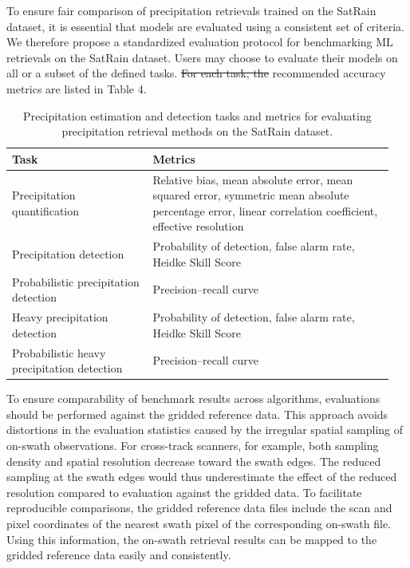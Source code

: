 \documentclass[11pt]{article}
\providecommand{\DIFadd}[1]{{\protect\color{blue}\uwave{#1}}} %
\providecommand{\DIFdel}[1]{{\protect\color{red}\sout{#1}}}                      %
\providecommand{\DIFaddbegin}{} %
\providecommand{\DIFaddend}{} %
\providecommand{\DIFdelbegin}{} %
\providecommand{\DIFdelend}{} %
\begin{document}
To ensure fair comparison of precipitation retrievals trained on the SatRain
dataset, it is essential that models are evaluated using a consistent set of
criteria. We therefore propose a standardized evaluation protocol for
benchmarking ML retrievals on the SatRain dataset. Users may choose to evaluate
their models on all or a subset of the defined tasks. \DIFdelbegin \DIFdel{For
each task, the }\DIFdelend \DIFaddbegin \DIFadd{The }\DIFaddend recommended accuracy
metrics \DIFaddbegin \DIFadd{for each task }\DIFaddend are listed in Table 4.

\begin{table}[htbp]
	\centering
	\caption{Precipitation estimation and detection tasks and metrics for evaluating
		precipitation retrieval methods on the SatRain dataset.}
	\begin{tabular}{>{\raggedright\arraybackslash}p{0.35\linewidth}
		>{\raggedright\arraybackslash}p{0.6\linewidth}} \toprule
		\textbf{Task}                               & \textbf{Metrics}                                   \\ \midrule Precipitation quantification &
		Relative bias, mean absolute error, mean squared error, symmetric mean
		absolute percentage error, linear correlation coefficient, effective
		resolution                                                                                       \\
		\addlinespace
		Precipitation detection                     & Probability of detection, false alarm rate, Heidke
		Skill Score                                                                                      \\
		\addlinespace
		Probabilistic precipitation detection       & Precision--recall curve                            \\
		\addlinespace
		Heavy precipitation detection               & Probability of detection, false alarm rate,
		Heidke Skill Score                                                                               \\
		\addlinespace
		Probabilistic heavy precipitation detection & Precision--recall curve
		\\ \bottomrule
	\end{tabular}
\end{table}

To ensure comparability of benchmark results across algorithms, evaluations
should be performed against the gridded reference data. This approach avoids
distortions in the evaluation statistics caused by the irregular spatial
sampling of on-swath observations. For cross-track scanners, for example, both
sampling density and spatial resolution decrease toward the swath edges. The
reduced sampling at the swath edges would thus underestimate the effect of the
reduced resolution compared to evaluation against the gridded data. To
facilitate reproducible comparisons, the gridded reference data files include the scan
and pixel coordinates of the nearest swath pixel of the corresponding on-swath file.
Using this information, the on-swath retrieval results can be mapped to the gridded
reference data easily and consistently.
\end{document}
